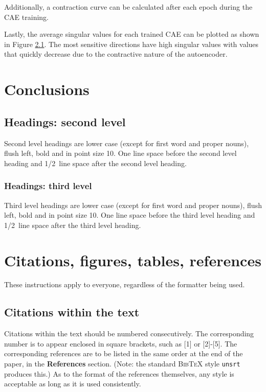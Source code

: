 \documentclass{article} %
\begin{document}

Additionally, a contraction curve can be calculated after each epoch during the CAE training.


Lastly, the average singular values for each trained CAE can be plotted as shown in Figure \ref{}. The most sensitive directions have high singular values with values that quickly decrease due to the contractive nature of the autoencoder.

\section{Conclusions}


\subsection{Headings: second level}

Second level headings are lower case (except for first word and proper nouns),
flush left, bold and in point size 10. One line space before the second level
heading and 1/2~line space after the second level heading.

\subsubsection{Headings: third level}

Third level headings are lower case (except for first word and proper nouns),
flush left, bold and in point size 10. One line space before the third level
heading and 1/2~line space after the third level heading.

\section{Citations, figures, tables, references}
\label{others}

These instructions apply to everyone, regardless of the formatter being used.

\subsection{Citations within the text}

Citations within the text should be numbered consecutively. The corresponding
number is to appear enclosed in square brackets, such as [1] or [2]-[5]. The
corresponding references are to be listed in the same order at the end of the
paper, in the \textbf{References} section. (Note: the standard
\textsc{Bib\TeX} style \texttt{unsrt} produces this.) As to the format of the
references themselves, any style is acceptable as long as it is used
consistently.
\end{document}
